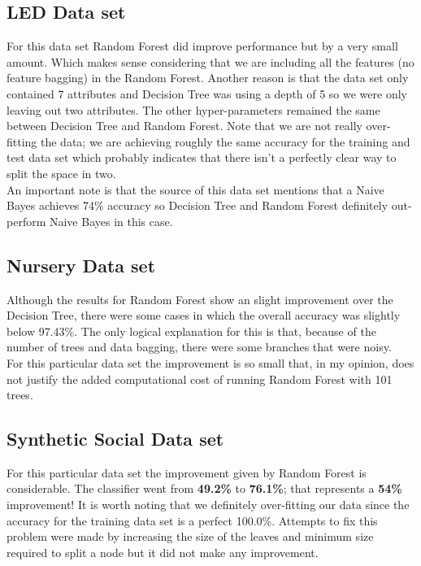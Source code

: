 \documentclass[11pt]{article}
\begin{document}
\subsection*{LED Data set}
For this data set Random Forest did improve performance but by a very small amount. Which makes sense considering that we are including all the features (no feature bagging) in the Random Forest. Another reason is that the data set only contained 7 attributes and Decision Tree was using a depth of 5 so we were only leaving out two attributes. The other hyper-parameters remained the same between Decision Tree and Random Forest. Note that we are not really over-fitting the data; we are achieving roughly the same accuracy for the training and test data set which probably indicates that there isn't a perfectly clear way to split the space in two. \\

An important note is that the source of this data set mentions that a Naive Bayes achieves 74\% accuracy so Decision Tree and Random Forest definitely out-perform Naive Bayes in this case.

\subsection*{Nursery Data set}
Although the results for Random Forest show an slight improvement over the Decision Tree, there were some cases in which the overall accuracy was slightly below 97.43\%. The only logical explanation for this is that, because of the number of trees and data bagging, there were some branches that were noisy. \\

For this particular data set the improvement is so small that, in my opinion, does not justify the added computational cost of running Random Forest with 101 trees.

\subsection*{Synthetic Social Data set}
For this particular data set the improvement given by Random Forest is considerable. The classifier went from \textbf{49.2\%} to \textbf{76.1\%}; that represents a \textbf{54\%} improvement! It is worth noting that we definitely over-fitting our data since the accuracy for the training data set is a perfect 100.0\%. Attempts to fix this problem were made by increasing the size of the leaves and minimum size required to split a node but it did not make any improvement.
\end{document}
